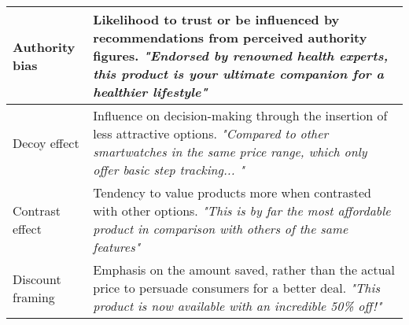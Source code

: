 \begin{table*}[t!]
\begin{sc}
\begin{tabular}{p{2.4cm}|p{13.7cm}}
Authority \newline bias & \textnormal{Likelihood to trust or be influenced by recommendations from perceived authority figures.  \newline \textit{"Endorsed by renowned health experts, this product is your ultimate companion for a healthier lifestyle"}} \\ \hline
Decoy effect & \textnormal{Influence on decision-making through the insertion of less attractive options.  \newline \textit{"Compared to other smartwatches in the same price range, which only offer basic step tracking...
"} }\\ \hline
Contrast \newline effect & \textnormal{Tendency to value products more when contrasted with other options.  \newline \textit{"This is by far the most affordable product in comparison with others of the same features"}} \\ \hline
Discount \newline framing & \textnormal{Emphasis on the amount saved, rather than the actual price to persuade consumers for a better deal.  \newline \textit{"This product is now available with an incredible 50\% off!"}}\\
\hline
\end{tabular}
\end{sc}
\end{table*}